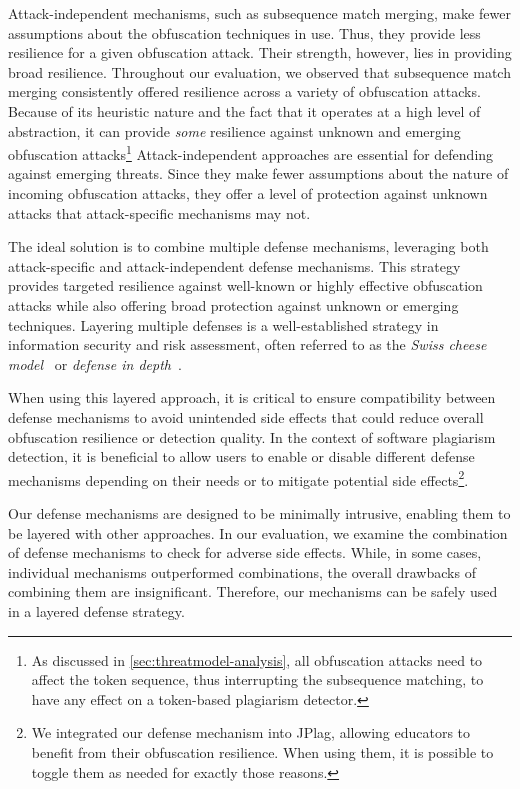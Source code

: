 Attack-independent mechanisms, such as subsequence match merging, make fewer assumptions about the obfuscation techniques in use. Thus, they provide less resilience for a given obfuscation attack. 
Their strength, however, lies in providing broad resilience.
Throughout our evaluation, we observed that subsequence match merging consistently offered resilience across a variety of obfuscation attacks.
Because of its heuristic nature and the fact that it operates at a high level of abstraction, it can provide \textit{some} resilience against unknown and emerging obfuscation attacks\footnote{As discussed in \autoref{sec:threatmodel-analysis}, all obfuscation attacks need to affect the token sequence, thus interrupting the subsequence matching, to have any effect on a token-based plagiarism detector.}
Attack-independent approaches are essential for defending against emerging threats.
Since they make fewer assumptions about the nature of incoming obfuscation attacks, they offer a level of protection against unknown attacks that attack-specific mechanisms may not.

The ideal solution is to combine multiple defense mechanisms, leveraging both attack-specific and attack-independent defense mechanisms.
This strategy provides targeted resilience against well-known or highly effective obfuscation attacks while also offering broad protection against unknown or emerging techniques.
Layering multiple defenses is a well-established strategy in information security and risk assessment, often referred to as the \textit{Swiss cheese model}~\cite{Reason1990} or \textit{defense in depth}~\cite{Stytz2004, Lippmann2006, Anderson2020}.

When using this layered approach, it is critical to ensure compatibility between defense mechanisms to avoid unintended side effects that could reduce overall obfuscation resilience or detection quality.
In the context of software plagiarism detection, it is beneficial to allow users to enable or disable different defense mechanisms depending on their needs or to mitigate potential side effects\footnote{We integrated our defense mechanism into JPlag, allowing educators to benefit from their obfuscation resilience. When using them, it is possible to toggle them as needed for exactly those reasons.}.

Our defense mechanisms are designed to be minimally intrusive, enabling them to be layered with other approaches.
In our evaluation, we examine the combination of defense mechanisms to check for adverse side effects.
While, in some cases, individual mechanisms outperformed combinations, the overall drawbacks of combining them are insignificant.
Therefore, our mechanisms can be safely used in a layered defense strategy.

